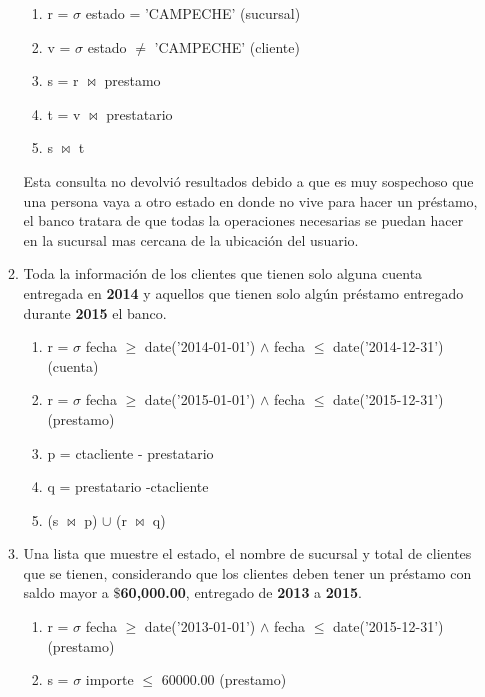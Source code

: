 \documentclass[10pt,letterpaper,fleqn]{article}
\begin{document}
\begin{enumerate}
\begin{enumerate}[a]
            \begin{enumerate}[1]
                \item \textbar \quad r = $\sigma$ estado = 'CAMPECHE' (sucursal)
                \item \textbar \quad v = $\sigma$ estado $\neq$ 'CAMPECHE' (cliente)
                \item \textbar \quad s = r $\bowtie$ prestamo
                \item \textbar \quad t = v $\bowtie$ prestatario
                \item \textbar \quad s $\bowtie$ t
            \end{enumerate}
            Esta consulta no devolvió resultados debido a que es muy sospechoso que una persona vaya a otro estado en donde no vive para hacer un préstamo, el banco tratara de que todas la operaciones necesarias se puedan hacer en la sucursal mas cercana de la ubicación del usuario.
            \item Toda la información de los clientes que tienen solo alguna cuenta entregada en \textbf{2014} y aquellos que tienen solo algún préstamo entregado durante \textbf{2015} el banco.
            \begin{enumerate}[1]
                \item \textbar \quad r = $\sigma$ fecha $\geq$ date('2014-01-01') $\land$ fecha $\leq$ date('2014-12-31') (cuenta)
                \item \textbar \quad r = $\sigma$ fecha $\geq$ date('2015-01-01') $\land$ fecha $\leq$ date('2015-12-31') (prestamo)
                \item \textbar \quad p = ctacliente - prestatario
                \item \textbar \quad q = prestatario -ctacliente 
                \item \textbar \quad (s $\bowtie$ p) $\cup$ (r $\bowtie$ q)
            \end{enumerate}
            \item Una lista que muestre el estado, el nombre de sucursal y total de clientes que se tienen, considerando que los clientes deben tener un préstamo con saldo mayor a $\$$\textbf{60,000.00}, entregado de \textbf{2013} a \textbf{2015}.
            \begin{enumerate}[1]
                \item \textbar \quad r = $\sigma$ fecha $\geq$ date('2013-01-01') $\land$ fecha $\leq$ date('2015-12-31') (prestamo)
                \item \textbar \quad s = $\sigma$ importe $\leq$ 60000.00 (prestamo)

\end{enumerate}
\end{enumerate}
\end{enumerate}
\end{document}
